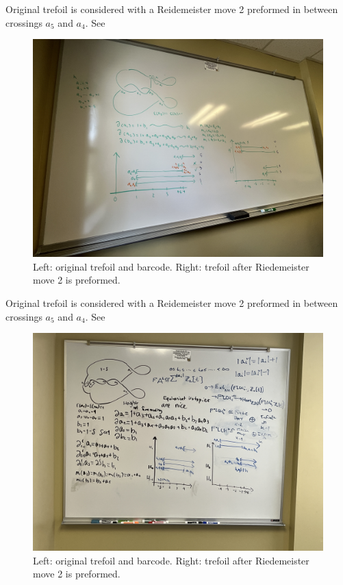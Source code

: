 \documentclass[General-Information/Most_recent_log(3_0).tex]{subfiles}
\begin{document}
\begin{example}
    \label{ex:3}
    Original trefoil is considered with a Reidemeister move 2 preformed in between crossings $a_5$ and $a_4$. See 
    \begin{figure}[H]
        \centering
        \includegraphics[width=\textwidth]{General-Information/Pictures/Examples/IMG-2754.JPG}
        \caption{Left: original trefoil and barcode. Right: trefoil after Riedemeister move 2 is preformed.}
    \end{figure}
\end{example}

\begin{example}
    \label{ex:4}
    Original trefoil is considered with a Reidemeister move 2 preformed in between crossings $a_5$ and $a_4$. See 
    \begin{figure}[H]
        \centering
        \includegraphics[width=\textwidth]{General-Information/Pictures/Examples/IMG-2758.JPG}
        \caption{Left: original trefoil and barcode. Right: trefoil after Riedemeister move 2 is preformed.}
    \end{figure}
\end{example}
\end{document}
